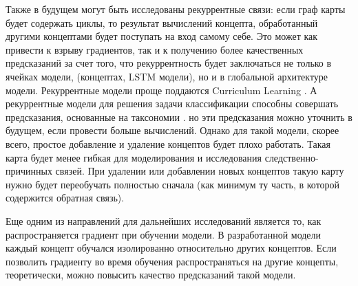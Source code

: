 Также в будущем могут быть исследованы рекуррентные связи:
если граф карты будет содержать циклы, то результат вычислений
концепта, обработанный другими концептами будет поступать на вход
самому себе. Это может как привести к взрыву градиентов, так и к
получению более качественных предсказаний за счет того, что рекуррентность
будет заключаться не только в ячейках модели, (концептах, LSTM модели), но и в
глобальной архитектуре модели. Рекуррентные модели проще поддаются Curriculum Learning \cite{bengio2009curriculum} \cite{curriculum_taxonomy}.
А рекуррентные модели для решения задачи классификации способны совершать
предсказания, основанные на таксономии \cite{curriculum_taxonomy}.
но эти предсказания можно уточнить в будущем, если провести больше вычислений.
Однако для такой модели, скорее всего,
простое добавление и удаление концептов будет плохо работать. Такая карта будет
менее гибкая для моделирования и исследования следственно-причинных связей.
При удалении или добавлении новых концептов такую карту нужно будет переобучать полностью
сначала (как минимум ту часть, в которой содержится обратная связь).

Еще одним из направлений для дальнейших исследований является то,
как распространяется градиент при обучении модели. В разработанной
модели каждый концепт обучался изолированно относительно других концептов.
Если позволить градиенту во время обучения распространяться на другие
концепты, теоретически, можно повысить качество предсказаний такой модели.
